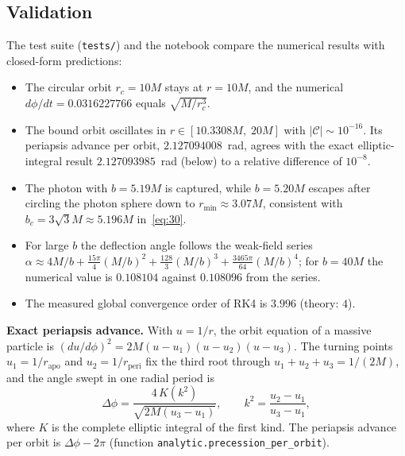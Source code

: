 \documentclass[11pt,a4paper]{article}
\begin{document}
\subsection{Validation}

The test suite (\texttt{tests/}) and the notebook compare the numerical results with closed-form predictions:
\begin{itemize}
  \item The circular orbit $r_c = 10M$ stays at $r = 10M$, and the numerical $d\phi/dt = 0.0316227766$ equals $\sqrt{M/r_c^3}$.
  \item The bound orbit oscillates in $r \in [10.3308M,\; 20M]$ with $|\mathcal{C}| \sim 10^{-16}$. Its periapsis advance per orbit, $2.127094008$~rad, agrees with the exact elliptic-integral result $2.127093985$~rad (below) to a relative difference of $10^{-8}$.
  \item The photon with $b = 5.19M$ is captured, while $b = 5.20M$ escapes after circling the photon sphere down to $r_{\min} \approx 3.07M$, consistent with $b_c = 3\sqrt{3}M \approx 5.196M$ in~\eqref{eq:30}.
  \item For large $b$ the deflection angle follows the weak-field series $\alpha \approx 4M/b + \frac{15\pi}{4}(M/b)^2 + \frac{128}{3}(M/b)^3 + \frac{3465\pi}{64}(M/b)^4$; for $b = 40M$ the numerical value is $0.108104$ against $0.108096$ from the series.
  \item The measured global convergence order of RK4 is $3.996$ (theory: $4$).
\end{itemize}

\textbf{Exact periapsis advance.} With $u = 1/r$, the orbit equation of a massive particle is $(du/d\phi)^2 = 2M(u - u_1)(u - u_2)(u - u_3)$. The turning points $u_1 = 1/r_{\text{apo}}$ and $u_2 = 1/r_{\text{peri}}$ fix the third root through $u_1 + u_2 + u_3 = 1/(2M)$, and the angle swept in one radial period is
\begin{equation*}
\Delta\phi = \frac{4\,K(k^2)}{\sqrt{2M(u_3 - u_1)}}, \qquad k^2 = \frac{u_2 - u_1}{u_3 - u_1},
\end{equation*}
where $K$ is the complete elliptic integral of the first kind. The periapsis advance per orbit is $\Delta\phi - 2\pi$ (function \texttt{analytic.precession\_per\_orbit}).
\end{document}
